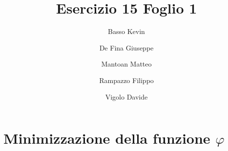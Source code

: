 \documentclass[a4paper]{article}
\title{Esercizio 15 Foglio 1}
\author{Basso Kevin \\
        \and De Fina Giuseppe \\
        \and Mantoan Matteo \\
        \and Rampazzo Filippo \\
     \and Vigolo Davide}
\begin{document}
\maketitle

\part{Minimizzazione della funzione \(\varphi\)}
\end{document}
